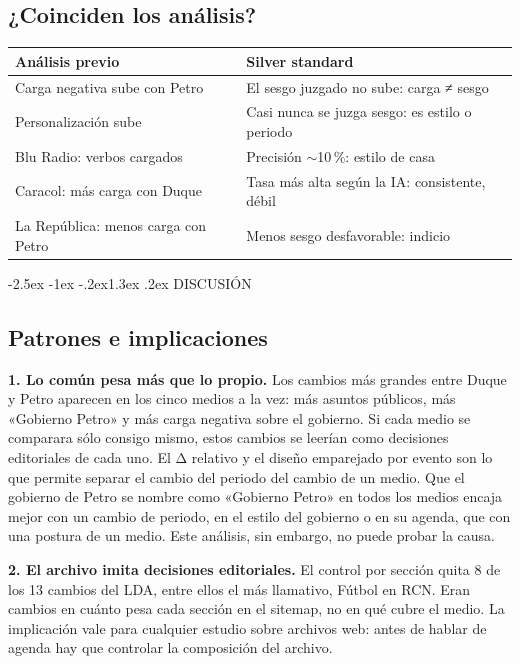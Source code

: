 \documentclass[10pt,twocolumn]{article}
\makeatletter
\renewcommand{\section}{\@startsection{section}{1}{\z@}%
  {-2.5ex \@plus -1ex \@minus -.2ex}{1.3ex \@plus .2ex}%
  {\normalfont\large\bfseries\centering}}
\makeatother
\begin{document}
\subsection{¿Coinciden los análisis?}
\begin{center}\small\begin{tabular}{L{3.2cm}L{4.4cm}}\toprule
Análisis previo & Silver standard\\\midrule
Carga negativa sube con Petro & El sesgo juzgado no sube: carga ≠ sesgo\\
Personalización sube & Casi nunca se juzga sesgo: es estilo o periodo\\
Blu Radio: verbos cargados & Precisión $\sim$10\,\%: estilo de casa\\
Caracol: más carga con Duque & Tasa más alta según la IA: consistente, débil\\
La República: menos carga con Petro & Menos sesgo desfavorable: indicio\\
\bottomrule\end{tabular}\end{center}

\section{DISCUSIÓN}
\subsection{Patrones e implicaciones}
\textbf{1. Lo común pesa más que lo propio.} Los cambios más grandes entre Duque
y Petro aparecen en los cinco medios a la vez: más asuntos públicos, más
«Gobierno Petro» y más carga negativa sobre el gobierno. Si cada medio se
comparara sólo consigo mismo, estos cambios se leerían como decisiones
editoriales de cada uno. El Δ relativo y el diseño emparejado por evento son lo
que permite separar el cambio del periodo del cambio de un medio. Que el
gobierno de Petro se nombre como «Gobierno Petro» en todos los medios encaja
mejor con un cambio de periodo, en el estilo del gobierno o en su agenda, que con
una postura de un medio. Este análisis, sin embargo, no puede probar la causa.

\textbf{2. El archivo imita decisiones editoriales.} El control por sección quita
8 de los 13 cambios del LDA, entre ellos el más llamativo, Fútbol en RCN. Eran
cambios en cuánto pesa cada sección en el sitemap, no en qué cubre el medio. La
implicación vale para cualquier estudio sobre archivos web: antes de hablar de
agenda hay que controlar la composición del archivo.
\end{document}

